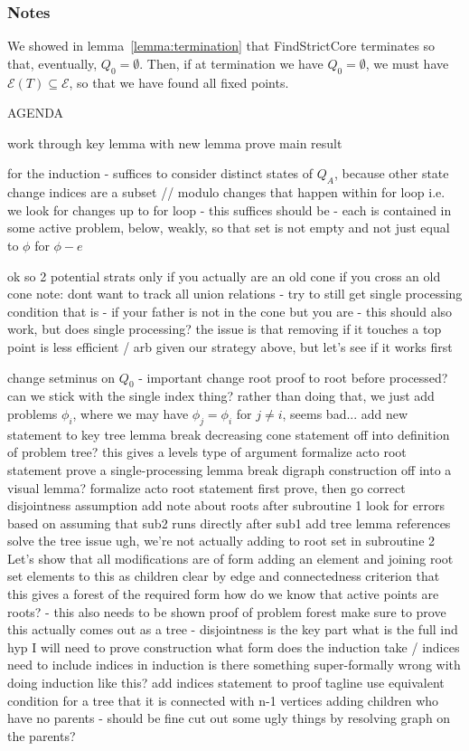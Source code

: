 \documentclass[11pt,reqno]{amsart}
\theoremstyle{definition}
\numberwithin{equation}{section}
\newcommand{\pre}{\phi}
\newcommand{\sub}{\subseteq}
\newcommand{\fix}{\mathcal{E}}
\newcommand{\acto}{Q_0}
\newcommand{\acta}{Q_A}
\newcommand{\fixfind}{\mathcal{E}}
\begin{document}
\begin{enumerate}
\subsubsection{Notes}

We showed in lemma~\ref{lemma:termination} that FindStrictCore terminates so that, eventually, $\acto = \emptyset$.
Then, if at termination we have $\acto = \emptyset$, we must have $\fix(T) \sub \fixfind$, so that we have found all fixed points.




AGENDA

work through key lemma with new lemma 
prove main result

for the induction - suffices to consider distinct states of $\acta$, because other state change indices are a subset // modulo changes that happen within for loop i.e. we look for changes up to for loop - this suffices
    should be - each is contained in some active problem, below, weakly, so that set is not empty and not just equal to $\pre$ for $\pre - e$

ok so 2 potential strats
    only if you actually are an old cone 
    if you cross an old cone 
        note: dont want to track all union relations - try to still get single processing condition
        that is - if your father is not in the cone but you are - this should also work, but does single processing? 
        the issue is that removing if it touches a top point is less efficient / arb given our strategy above, but let's see if it works first 

change setminus on $\acto$ - important 
change root proof to root before processed? 
can we stick with the single index thing? 
rather than doing that, we just add problems $\pre_i$, where we may have $\pre_j = \pre_i$ for $j \not = i$, seems bad...
add new statement to key tree lemma
break decreasing cone statement off into definition of problem tree? 
this gives a levels type of argument 
formalize acto root statement
prove a single-processing lemma 
break digraph construction off into a visual lemma? 
formalize acto root statement 
first prove, then go correct disjointness assumption
add note about roots after subroutine 1 
look for errors based on assuming that sub2 runs directly after sub1
add tree lemma references
solve the tree issue
ugh, we're not actually adding to root set in subroutine 2 
Let's show that all modifications are of form
    adding an element and joining root set elements to this as children 
    clear by edge and connectedness criterion that this gives a forest of the required form 
how do we know that active points are roots? - this also needs to be shown
proof of problem forest
make sure to prove this actually comes out as a tree - disjointness is the key part
what is the full ind hyp I will need to prove construction 
what form does the induction take / indices
need to include indices in induction
is there something super-formally wrong with doing induction like this? 
add indices statement to proof tagline
use equivalent condition for a tree that it is connected with n-1 vertices
adding children who have no parents - should be fine 
cut out some ugly things by resolving graph on the parents? 


\end{enumerate}
\end{document}
